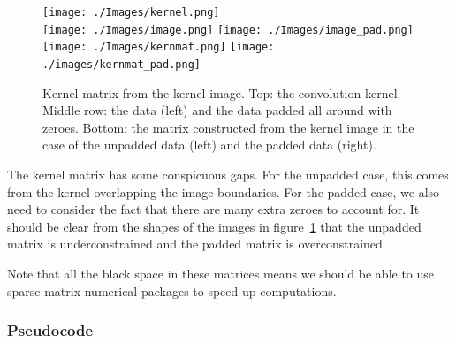 \documentclass[letterpaper, 11pt]{article}
\begin{document}
\begin{figure}[h]
	\centering
	\texttt{[image: ./Images/kernel.png]}\\\vspace{1mm}
	\texttt{[image: ./Images/image.png]}
	\texttt{[image: ./Images/image\_pad.png]}\\\vspace{1mm}
	\texttt{[image: ./Images/kernmat.png]}
	\texttt{[image: ./images/kernmat\_pad.png]}
	\caption{Kernel matrix from the kernel image. Top: the convolution kernel. Middle row: the data (left) and the data padded all around with zeroes. Bottom: the matrix constructed from the kernel image in the case of the unpadded data (left) and the padded data (right).}
	\label{fig:kernmat_pad}
\end{figure}

The kernel matrix has some conspicuous gaps. For the unpadded case, this comes from the kernel overlapping the image boundaries. For the padded case, we also need to consider the fact that there are many extra zeroes to account for. It should be clear from the shapes of the images in figure~\ref{fig:kernmat_pad} that the unpadded matrix is underconstrained and the padded matrix is overconstrained.

Note that all the black space in these matrices means we should be able to use sparse-matrix numerical packages to speed up computations.

\subsubsection{Pseudocode}
\label{sec:decon_pseudocode}
\end{document}
